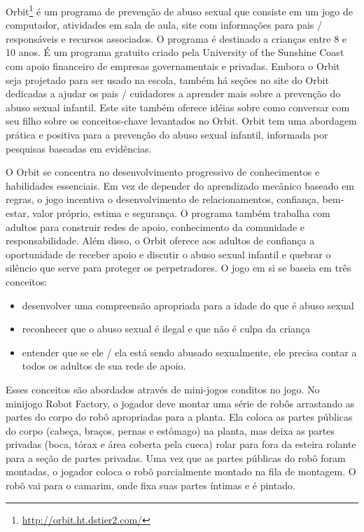Orbit\footnote{\url{http://orbit.ht.dstier2.com/}} é um programa de prevenção de abuso sexual que consiste em um jogo de computador, atividades em sala de aula, site com informações para pais / responsáveis e recursos associados. O programa é destinado a crianças entre 8 e 10 anos. É um programa gratuito criado pela University of the Sunshine Coast com apoio financeiro de empresas governamentais e privadas. Embora o Orbit seja projetado para ser usado na escola, também há seções no site do Orbit dedicadas a ajudar os pais / cuidadores a aprender mais sobre a prevenção do abuso sexual infantil. Este site também oferece idéias sobre como conversar com seu filho sobre os conceitos-chave levantados no Orbit. Orbit tem uma abordagem prática e positiva para a prevenção do abuso sexual infantil, informada por pesquisas baseadas em evidências. 

\newpage


O Orbit se concentra no desenvolvimento progressivo de conhecimentos e habilidades essenciais. Em vez de depender do aprendizado mecânico baseado em regras, o jogo incentiva o desenvolvimento de relacionamentos, confiança, bem-estar, valor próprio, estima e segurança. O programa também trabalha com adultos para construir redes de apoio, conhecimento da comunidade e responsabilidade. Além disso, o Orbit oferece aos adultos de confiança a oportunidade de receber apoio e discutir o abuso sexual infantil e quebrar o silêncio que serve para proteger os perpetradores. O jogo em si se baseia em três conceitos: 

\begin{itemize}
  \item desenvolver uma compreensão apropriada para a idade do que é abuso sexual
  \item reconhecer que o abuso sexual é ilegal e que não é culpa da criança
  \item entender que se ele / ela está sendo abusado sexualmente, ele precisa contar a todos os adultos de sua rede de apoio.
\end{itemize}

Esses conceitos são abordados através de mini-jogos conditos no jogo. No minijogo Robot Factory, o jogador deve montar uma série de robôs arrastando as partes do corpo do robô apropriadas para a planta. Ela coloca as partes públicas do corpo (cabeça, braços, pernas e estômago) na planta, mas deixa as partes privadas (boca, tórax e área coberta pela cueca) rolar para fora da esteira rolante para a seção de partes privadas. Uma vez que as partes públicas do robô foram montadas, o jogador coloca o robô parcialmente montado na fila de montagem. O robô vai para o camarim, onde fixa suas partes íntimas e é pintado.


